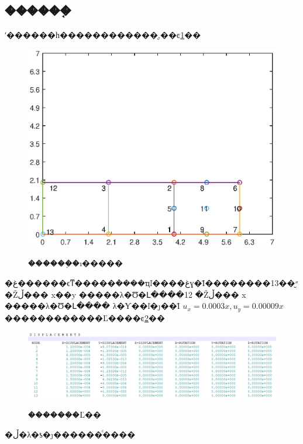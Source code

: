 \subsection{������֤}
    ʹ������һ������������֤,��ͼ\ref{5QExample}��
    \begin{figure}[h]
        \centering
        \includegraphics[width=.6\textwidth]{./elements/fig/5QExample.eps}
        \label{5QExample}
        \caption{������֤�ı�����}
    \end{figure}
    
    �غ������ϵͳ�����ܵ����ҵľ����غɣ�Ϊ��������״̬��13 �Žڵ��� x��y �����λ�Ʊ�Լ����12 �Žڵ��� x �����λ�Ʊ�Լ����
    λ�Ƴ��ľ�ȷ��Ϊ $u_x=0.0003x,u_y=0.00009x$������������Ľ����ͼ\ref{5QResult}��
    \begin{figure}[h]
        \centering
        \includegraphics[width=.6\textwidth]{./elements/fig/5Qpass.png}
        \label{5QResult}
        \caption{������֤�Ľ��}
    \end{figure}

    �ڵ�λ�ƾ�ȷ������ͨ����
